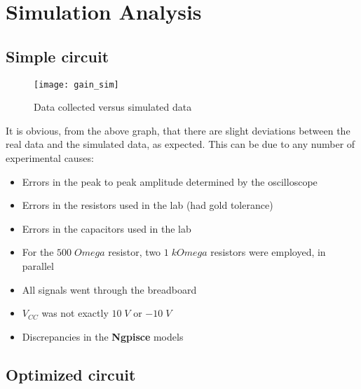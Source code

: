 \newpage

\section{Simulation Analysis}
\label{sec:simulation}

\subsection{Simple circuit}

\begin{figure}[H]
\centering
\texttt{[image: gain\_sim]}
\caption{Data collected versus simulated data}
\label{data_graph_sim}
\end{figure}

It is obvious, from the above graph, that there are slight deviations between the real data and the simulated data, as expected. This can be due to any number of experimental causes:

\begin{itemize}

\item Errors in the peak to peak amplitude determined by the oscilloscope

\item Errors in the resistors used in the lab (had gold tolerance)

\item Errors in the capacitors used in the lab

\item For the $500\;Omega$ resistor, two $1\;kOmega$ resistors were employed, in parallel

\item All signals went through the breadboard

\item $V_{CC}$ was not exactly $10\;V$ or $-10\;V$

\item Discrepancies in the {\bf Ngpisce} models

\end{itemize}

\subsection{Optimized circuit}
